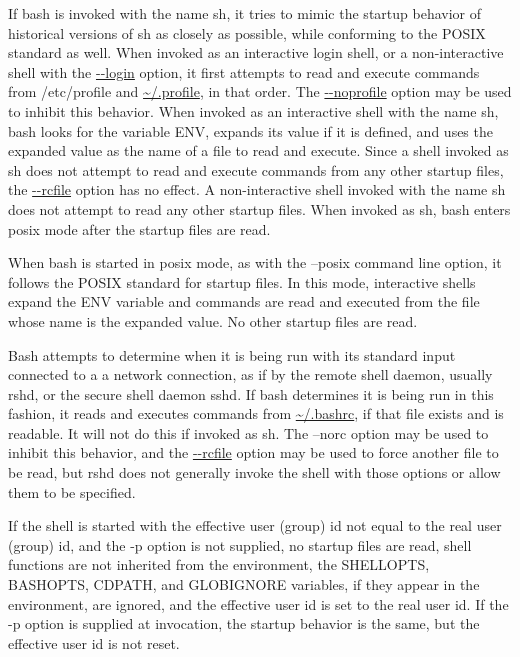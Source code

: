 If bash is invoked with the name sh, it tries to mimic the startup behavior of historical versions of sh as closely as possible, while conforming to the POSIX standard as well. When invoked as an interactive login shell, or a non-interactive shell with the \url{--login} option, it first attempts to read and execute commands from /etc/profile and \url{~/.profile}, in that order. The \url{--noprofile} option may be used to inhibit this behavior. When invoked as an interactive shell with the name sh, bash looks for the variable ENV, expands its value if it is defined, and uses the expanded value as the name of a file to read and execute. Since a shell invoked as sh does not attempt to read and execute commands from any other startup files, the \url{--rcfile} option has no effect. A non-interactive shell invoked with the name sh does not attempt to read any other startup files. When invoked as sh, bash enters posix mode after the startup files are read.

When bash is started in posix mode, as with the --posix command line option, it follows the POSIX standard for startup files. In this mode, interactive shells expand the ENV variable and commands are read and executed from the file whose name is the expanded value. No other startup files are read.

Bash attempts to determine when it is being run with its standard input connected to a a network connection, as if by the remote shell daemon, usually rshd, or the secure shell daemon sshd. If bash determines it is being run in this fashion, it reads and executes commands from \url{~/.bashrc}, if that file exists and is readable. It will not do this if invoked as sh. The --norc option may be used to inhibit this behavior, and the \url{--rcfile} option may be used to force another file to be read, but rshd does not generally invoke the shell with those options or allow them to be specified.

If the shell is started with the effective user (group) id not equal to the real user (group) id, and the -p option is not supplied, no startup files are read, shell functions are not inherited from the environment, the SHELLOPTS, BASHOPTS, CDPATH, and GLOBIGNORE variables, if they appear in the environment, are ignored, and the effective user id is set to the real user id. If the -p option is supplied at invocation, the startup behavior is the same, but the effective user id is not reset.